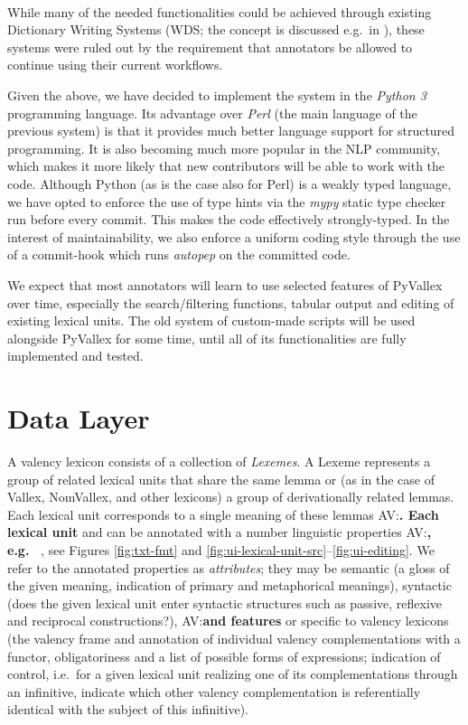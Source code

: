 \documentclass[10pt, a4paper]{article}
\newcommand{\avout}[2][]{{\color{ansa} AV:}{\color{lightgray}\textbf{#2}} {\color{ansa} #1}}
\begin{document}
\paragraph{} While many of the needed functionalities could be achieved through existing Dictionary Writing Systems
(WDS; the concept is discussed e.g.\ in \cite{Abel12DWS}), these systems were ruled out by the requirement that annotators be allowed
to continue using their current workflows.

Given the above, we have decided to implement the system in the \emph{Python 3} programming
language. Its advantage over \emph{Perl} (the main language of the previous system) is that it provides
much better language support for structured programming. It is also becoming much more popular in
the NLP community, which makes it more likely that new contributors will be able to work with the
code. Although Python (as is the case also for Perl) is a weakly typed language, we have opted
to enforce the use of type hints via the \emph{mypy} static type checker \cite{tool:mypy} run before every commit.
This makes the code effectively strongly-typed. In the interest of maintainability, we also enforce
a uniform coding style through the use of a commit-hook which runs \emph{autopep} \cite{tool:autopep8}
on the committed code.

We expect that most annotators will learn to use selected features of PyVallex over time, especially the search/filtering functions, tabular output and editing of existing lexical units.
The old system of custom-made scripts will be used alongside PyVallex for some time, until all of its functionalities are fully implemented and tested.


\section{Data Layer}
A valency lexicon consists of a collection of \emph{Lexemes}. A Lexeme represents a group of related
lexical units that share the same lemma or (as in the case of Vallex, NomVallex, and other lexicons) a group of derivationally related lemmas. 
Each lexical unit corresponds to a single meaning of these lemmas\avout[ and ]{. Each lexical unit} can be annotated
with a number linguistic properties\avout[, see Figures \ref{fig:txt-fmt} and \ref{fig:ui-lexical-unit-src}--\ref{fig:ui-editing}. We refer to the annotated properties as \emph{attributes}; they may be ]{,
e.g.\ }
semantic (a gloss of the given meaning,
indication of primary and metaphorical meanings),
syntactic (does the given lexical unit enter syntactic structures such as passive, reflexive and reciprocal constructions?),
\avout[or]{and features} specific to valency lexicons
(the valency frame and annotation of individual valency complementations with a functor, obligatoriness and a list of possible forms of expressions;
indication of control, i.e.\ for a given lexical unit realizing one of its complementations through an infinitive,
indicate which other valency complementation is referentially identical with the subject of this infinitive).
\end{document}

